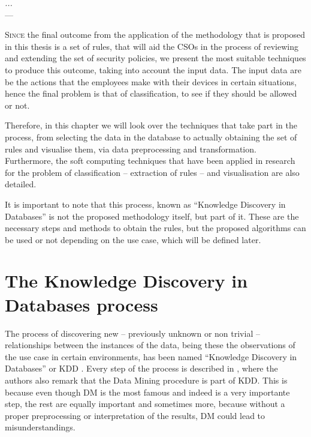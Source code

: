 \label{chap:softc} 

\begin{flushright}{\slshape
    ...} \\ \medskip
    --- {}
\end{flushright}

\minitoc\mtcskip
\vfill

\lettrine{S}{ince} the final outcome from the application of the methodology that is proposed in this thesis is a set of rules, that will aid the CSOs in the process of reviewing and extending the set of security policies, we present the most suitable techniques to produce this outcome, taking into account the input data. The input data are be the actions that the employees make with their devices in certain situations, hence the final problem is that of classification, to see if they should be allowed or not.

Therefore, in this chapter we will look over the techniques that take part in the process, from selecting the data in the database to actually obtaining the set of rules and visualise them, via data preprocessing and transformation. Furthermore, the soft computing techniques that have been applied in research for the problem of classification -- extraction of rules -- and visualisation are also detailed.

It is important to note that this process, known as ``Knowledge Discovery in Databases'' is not the proposed methodology itself, but part of it. These are the necessary steps and methods to obtain the rules, but the proposed algorithms can be used or not depending on the use case, which will be defined later.

\section{The Knowledge Discovery in Databases process}

The process of discovering new -- previously unknown or non trivial -- relationships between the instances of the data, being these the observations of the use case in certain environments, has been named ``Knowledge Discovery in Databases'' or KDD \cite{fayyad1996data}. Every step of the process is described in \cite{fayyad1996data}, where the authors also remark that the Data Mining procedure is part of KDD. This is because even though DM is the most famous and indeed is a very importante step, the rest are equally important and sometimes more, because without a proper preprocessing or interpretation of the results, DM could lead to misunderstandings.

